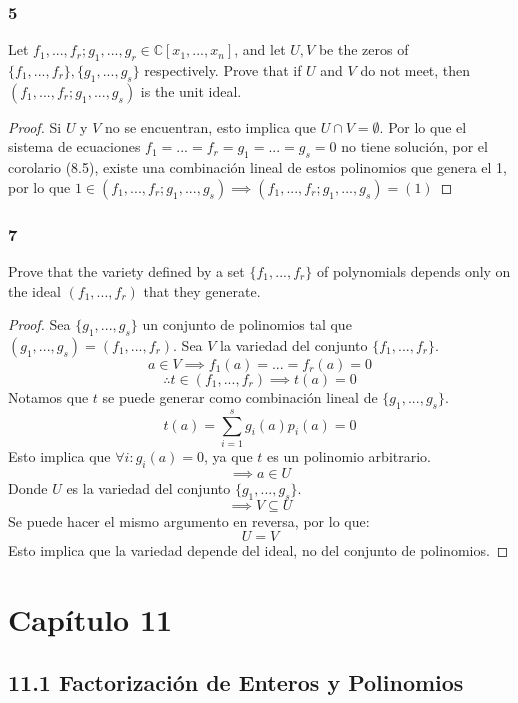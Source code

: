 \documentclass[11pt]{article}
\newcommand{\set}[1]{\mathbb{#1}}
\theoremstyle{definition}
\begin{document}
        \subsubsection{5}
        Let $f_1,...,f_r;g_1,...,g_r\in\set{C}[x_1,...,x_n]$, and let $U,V$ be the zeros of $\{f_1,...,f_r\},\{g_1,...,g_s\}$ respectively. Prove that if $U$ and $V$ do not meet, then $(f_1,...,f_r;g_1,...,g_s)$ is the unit ideal.
        \begin{proof}
            Si $U$ y $V$ no se encuentran, esto implica que $U\cap V=\emptyset$. Por lo que el sistema de ecuaciones $f_1=...=f_r=g_1=...=g_s=0$ no tiene solución, por el corolario (8.5), existe una combinación lineal de estos polinomios que genera el 1, por lo que $1\in(f_1,...,f_r;g_1,...,g_s)\implies (f_1,...,f_r;g_1,...,g_s)=(1)$
        \end{proof}

        \subsubsection{7}
        Prove that the variety defined by a set $\{f_1,...,f_r\}$ of polynomials depends only on the ideal $(f_1,...,f_r)$ that they generate.
        \begin{proof}
            Sea $\{g_1,...,g_s\}$ un conjunto de polinomios tal que $(g_1,...,g_s)=(f_1,...,f_r)$. Sea $V$ la variedad del conjunto $\{f_1,...,f_r\}$.
            \[a\in V\implies f_1(a)=...=f_r(a)=0\]
            \[\therefore t\in (f_1,...,f_r)\implies t(a)=0\]
            Notamos que $t$ se puede generar como combinación lineal de $\{g_1,...,g_s\}$.
            \[t(a)=\sum^s_{i=1}g_i(a)p_i(a)=0\]
            Esto implica que $\forall i:g_i(a)=0$, ya que $t$ es un polinomio arbitrario.
            \[\implies a\in U\]
            Donde $U$ es la variedad del conjunto $\{g_1,...,g_s\}$.
            \[\implies V\subseteq U\]
            Se puede hacer el mismo argumento en reversa, por lo que:
            \[U=V\]
            Esto implica que la variedad depende del ideal, no del conjunto de polinomios.
        \end{proof}

        \section{Capítulo 11}
        \subsection{11.1 Factorización de Enteros y Polinomios}
\end{document}

